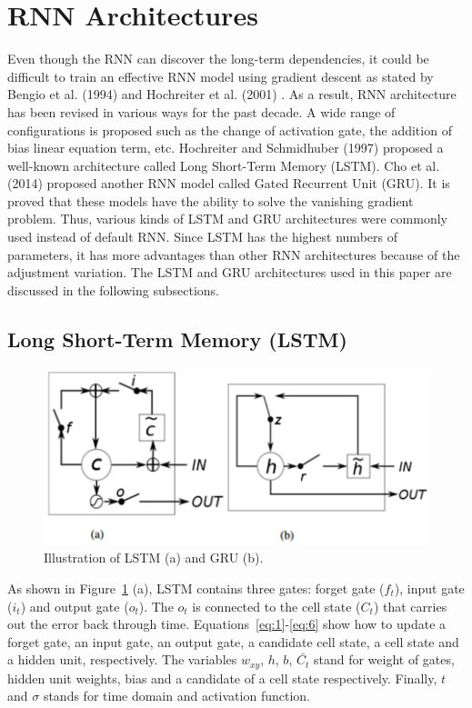 \setlength{\parindent}{0.5cm}
\section{RNN Architectures}
Even though the RNN can discover the long-term dependencies,
it could be difficult to train an effective RNN model using gradient descent
as stated by Bengio et al. (1994) \cite{bengio1994learning} and Hochreiter et al. (2001) \cite{hochreiter2001gradient}.
As a result, RNN architecture has been revised in various ways for the past decade.
A wide range of configurations is proposed such as the change 
of activation gate, the addition of bias linear equation term, etc. 
Hochreiter and Schmidhuber (1997) \cite{journals/neco/HochreiterS97} proposed a well-known architecture called
Long Short-Term Memory (LSTM).
Cho et al. (2014) \cite{cho2014learning} proposed another RNN model called Gated Recurrent Unit (GRU). 
It is proved that these models have the ability to solve the vanishing gradient problem.
Thus, various kinds of LSTM and GRU architectures were commonly used instead of default RNN.
Since LSTM has the highest numbers of parameters, 
it has more advantages than other RNN architectures because of the adjustment variation.
The LSTM and GRU architectures used in this paper are discussed in the following subsections.

\subsection{Long Short-Term Memory (LSTM)}
\begin{figure}[!h]
\centering
  \includegraphics[scale=1]{image/lstm_struc.png}
  \caption{Illustration of LSTM (a) and GRU (b).}
  \label{fig:1}
\end{figure}
As shown in Figure~\ref{fig:1} (a), LSTM contains three gates: forget gate ($f_t$), input gate ($i_t$) 
and output gate ($o_t$). 
The $o_t$ is connected to the cell state ($C_t$) that carries out the error 
back through time. Equations~\ref{eq:1}-\ref{eq:6} show how to update a forget gate, 
an input gate, an output gate, a candidate cell state, a cell state and a hidden unit, 
respectively. 
The variables $w_{xy}$, $h$, $b$, $\bar{C_t}$ stand for weight of gates, 
hidden unit weights, bias and a candidate of a cell state respectively. 
Finally, $t$ and $\sigma$ stands for time domain and activation function.
 
